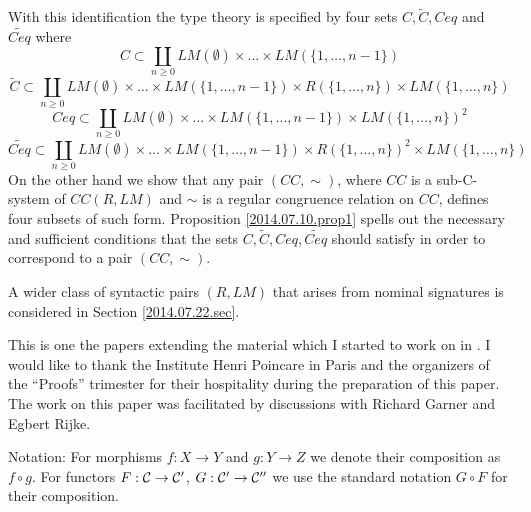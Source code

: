 \documentclass[11pt]{article}
\newcommand{\sr}{\rightarrow}
\newcommand{\wt}{\widetilde}
\begin{document}
With this identification the type theory is specified by four sets $C,\wt{C},Ceq$ and $\wt{Ceq}$ where 
%
$$C \subset \coprod_{n\ge 0} LM(\emptyset)\times\dots\times LM(\{1,\dots,n-1\})$$
$$\wt{C}\subset  \coprod_{n\ge 0} LM(\emptyset)\times\dots\times LM(\{1,\dots,n-1\})\times R(\{1,\dots,n\})\times LM(\{1,\dots,n\})$$
$$Ceq \subset \coprod_{n\ge 0} LM(\emptyset)\times\dots\times LM(\{1,\dots,n-1\})\times LM(\{1,\dots,n\})^2$$
$$\wt{Ceq} \subset \coprod_{n\ge 0} LM(\emptyset)\times\dots\times LM(\{1,\dots,n-1\})\times R(\{1,\dots,n\})^2\times LM(\{1,\dots,n\})$$ 
%
On the other hand we show that any pair $(CC,\sim)$, where $CC$ is a sub-C-system of $CC(R,LM)$ and $\sim$ is a regular congruence relation on $CC$, defines four subsets of such form. Proposition \ref{2014.07.10.prop1} spells out the necessary and sufficient conditions that the sets $C,\wt{C},Ceq,\wt{Ceq}$ should satisfy in order to correspond to a pair $(CC,\sim)$. 

A wider class of syntactic pairs $(R,LM)$ that arises from nominal signatures is considered in Section \ref{2014.07.22.sec}.  

This is one the papers extending the material which I started to work on in \cite{NTS}. I would like to thank the Institute Henri Poincare in Paris and the organizers of the ``Proofs'' trimester for their hospitality during the preparation of this paper. The work on this paper was facilitated by discussions with Richard Garner and Egbert Rijke. 

Notation: For morphisms $f:X\sr Y$ and $g:Y\sr Z$ we denote their composition as $f\circ g$. For functors $F:{\cal C}\sr {\cal C}'$, $G:{\cal C}'\sr {\cal C}''$ we use the standard notation $G\circ F$ for their composition. 
\end{document}
